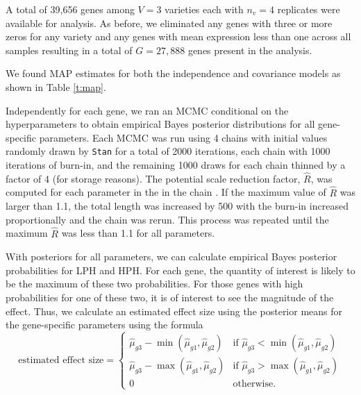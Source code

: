 \documentclass[useAMS,usenatbib,referee]{biom}
\begin{document}
A total of 39,656 genes among $V=3$ varieties each with $n_v=4$ replicates were available for analysis. As before, we eliminated any genes with three or more zeros for any variety and any genes with mean expression less than one across all samples resulting in a total of $G=27,888$ genes present in the analysis. 

We found MAP estimates for both the independence and covariance models as shown in Table \ref{t:map}. 

Independently for each gene, we ran an MCMC conditional on the hyperparameters to obtain empirical Bayes posterior distributions for all gene-specific parameters. Each MCMC was run using 4 chains with initial values randomly drawn by {\tt Stan} for a total of 2000 iterations, each chain with 1000 iterations of burn-in, and the remaining 1000 draws for each chain thinned by a factor of 4 (for storage reasons). The potential scale reduction factor, $\hat{R}$, was computed for each parameter in the in the chain \citep{Gelm:Rubi:infe:1992, Broo:Gelm:gene:1997}. If the maximum value of $\hat{R}$ was larger than 1.1, the total length was increased by 500 with the burn-in increased proportionally and the chain was rerun. This process was repeated until the maximum $\hat{R}$ was less than 1.1 for all parameters.

With posteriors for all parameters, we can calculate empirical Bayes posterior probabilities for LPH and HPH. For each gene, the quantity of interest is likely to be the maximum of these two probabilities. For those genes with high probabilities for one of these two, it is of interest to see the magnitude of the effect. Thus, we calculate an estimated effect size using the posterior means for the gene-specific parameters using the formula 
\begin{equation}
\mbox{estimated effect size} = \left\{ 
\begin{array}{ll}
\hat{\mu}_{g3} - \min(\hat{\mu}_{g1},\hat{\mu}_{g2}) & \mbox{if } \hat{\mu}_{g3} < \min(\hat{\mu}_{g1},\hat{\mu}_{g2}) \\
\hat{\mu}_{g3} - \max(\hat{\mu}_{g1},\hat{\mu}_{g2}) & \mbox{if } \hat{\mu}_{g3} > \max(\hat{\mu}_{g1},\hat{\mu}_{g2}) \\
0 & \mbox{otherwise}.
\end{array} 
\right. 
\label{e:effect_size}
\end{equation}
\end{document}
